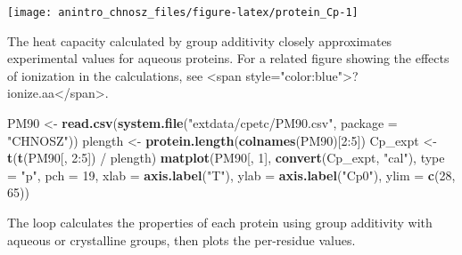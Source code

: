 \documentclass[]{tufte-book}
\newenvironment{Shaded}{}{}
\newcommand{\KeywordTok}[1]{\textcolor[rgb]{0.00,0.44,0.13}{\textbf{#1}}}
\newcommand{\DataTypeTok}[1]{\textcolor[rgb]{0.56,0.13,0.00}{#1}}
\newcommand{\DecValTok}[1]{\textcolor[rgb]{0.25,0.63,0.44}{#1}}
\newcommand{\StringTok}[1]{\textcolor[rgb]{0.25,0.44,0.63}{#1}}
\newcommand{\OperatorTok}[1]{\textcolor[rgb]{0.40,0.40,0.40}{#1}}
\newcommand{\NormalTok}[1]{#1}
\begin{document}
\begin{marginfigure}
\texttt{[image: anintro\_chnosz\_files/figure-latex/protein\_Cp-1]} \caption[The heat capacity calculated by group additivity closely approximates experimental values for aqueous proteins]{The heat capacity calculated by group additivity closely approximates experimental values for aqueous proteins. For a related figure showing the effects of ionization in the calculations, see <span style="color:blue">?ionize.aa</span>.}\label{fig:protein_Cp}
\end{marginfigure}

\begin{Shaded}
\begin{Highlighting}[]
\NormalTok{PM90 <-}\StringTok{ }\KeywordTok{read.csv}\NormalTok{(}\KeywordTok{system.file}\NormalTok{(}\StringTok{"extdata/cpetc/PM90.csv"}\NormalTok{, }\DataTypeTok{package =} \StringTok{"CHNOSZ"}\NormalTok{))}
\NormalTok{plength <-}\StringTok{ }\KeywordTok{protein.length}\NormalTok{(}\KeywordTok{colnames}\NormalTok{(PM90)[}\DecValTok{2}\OperatorTok{:}\DecValTok{5}\NormalTok{])}
\NormalTok{Cp_expt <-}\StringTok{ }\KeywordTok{t}\NormalTok{(}\KeywordTok{t}\NormalTok{(PM90[, }\DecValTok{2}\OperatorTok{:}\DecValTok{5}\NormalTok{]) }\OperatorTok{/}\StringTok{ }\NormalTok{plength)}
\KeywordTok{matplot}\NormalTok{(PM90[, }\DecValTok{1}\NormalTok{], }\KeywordTok{convert}\NormalTok{(Cp_expt, }\StringTok{"cal"}\NormalTok{), }\DataTypeTok{type =} \StringTok{"p"}\NormalTok{, }\DataTypeTok{pch =} \DecValTok{19}\NormalTok{,}
        \DataTypeTok{xlab =} \KeywordTok{axis.label}\NormalTok{(}\StringTok{"T"}\NormalTok{), }\DataTypeTok{ylab =} \KeywordTok{axis.label}\NormalTok{(}\StringTok{"Cp0"}\NormalTok{), }\DataTypeTok{ylim =} \KeywordTok{c}\NormalTok{(}\DecValTok{28}\NormalTok{, }\DecValTok{65}\NormalTok{))}
\end{Highlighting}
\end{Shaded}

The loop calculates the properties of each protein using group
additivity with aqueous or crystalline groups, then plots the
per-residue values.
\end{document}
